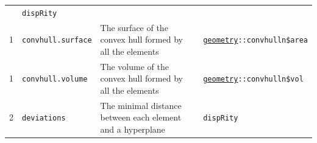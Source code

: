 \documentclass[
]{book}
\begin{document}
\begin{longtable}[]{@{}llll@{}}
\begin{minipage}[t]{0.64\columnwidth}
\end{minipage} & \begin{minipage}[t]{0.10\columnwidth}\raggedright
\texttt{dispRity}\strut
\end{minipage}\tabularnewline
\begin{minipage}[t]{0.07\columnwidth}\raggedright
1\strut
\end{minipage} & \begin{minipage}[t]{0.07\columnwidth}\raggedright
\texttt{convhull.surface}\strut
\end{minipage} & \begin{minipage}[t]{0.64\columnwidth}\raggedright
The surface of the convex hull formed by all the elements\strut
\end{minipage} & \begin{minipage}[t]{0.10\columnwidth}\raggedright
\href{https://cran.r-project.org/web/packages/geometry/index.html}{\texttt{geometry}}\texttt{::convhulln\$area}\strut
\end{minipage}\tabularnewline
\begin{minipage}[t]{0.07\columnwidth}\raggedright
1\strut
\end{minipage} & \begin{minipage}[t]{0.07\columnwidth}\raggedright
\texttt{convhull.volume}\strut
\end{minipage} & \begin{minipage}[t]{0.64\columnwidth}\raggedright
The volume of the convex hull formed by all the elements\strut
\end{minipage} & \begin{minipage}[t]{0.10\columnwidth}\raggedright
\href{https://cran.r-project.org/web/packages/geometry/index.html}{\texttt{geometry}}\texttt{::convhulln\$vol}\strut
\end{minipage}\tabularnewline
\begin{minipage}[t]{0.07\columnwidth}\raggedright
2\strut
\end{minipage} & \begin{minipage}[t]{0.07\columnwidth}\raggedright
\texttt{deviations}\strut
\end{minipage} & \begin{minipage}[t]{0.64\columnwidth}\raggedright
The minimal distance between each element and a hyperplane\strut
\end{minipage} & \begin{minipage}[t]{0.10\columnwidth}\raggedright
\texttt{dispRity}\strut
\end{minipage}\tabularnewline

\end{longtable}
\end{document}
